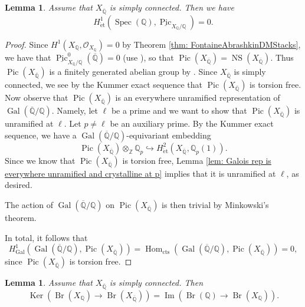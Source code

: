 \documentclass{amsart}
\newtheorem{lem}[prop]{Lemma}
\theoremstyle{definition}
\theoremstyle{remark}
\DeclareMathOperator{\Hom}{Hom}
\DeclareMathOperator{\Ker}{Ker}
\DeclareMathOperator{\Gal}{Gal}
\DeclareMathOperator{\Image}{Im}
\DeclareMathOperator{\Spec}{Spec}
\DeclareMathOperator{\Br}{Br}
\DeclareMathOperator{\Pic}{Pic}
\DeclareMathOperator{\NS}{NS}
\newcommand{\Q}{\mathbb{Q}}
\newcommand{\Qp}{\mathbb {Q}_p}
\newcommand{\Qbar}{\overline{\mathbb{Q}}}
\newcommand{\ZZ}{\mathbb Z}
\newcommand{\et}{\operatorname{\acute{e}t}}%
\begin{document}
\begin{lem}\label{lem Vanishing Galois coho Pic}
Assume that $X_{\Qbar}$ is simply connected.
Then we have
$$
H^{1}_{\et}(\Spec(\Q),\underline{\Pic}_{X_{\Q}/\Q})=0.
$$
\end{lem}
\begin{proof}
Since $H^{1}(X_{\Q},\mathcal{O}_{X_{\Q}})=0$ by Theorem \ref{thm: FontaineAbrashkinDMStacks}, we have that $\underline{\Pic}^{0}_{X_{\Q}/\Q}(\Qbar)=0$ (use \cite[Théorème 4.1.3]{BrochardPicardFunctorStack}), so that 
$
\Pic(X_{\Qbar})=\NS(X_{\Qbar}).
$
Thus $\Pic(X_{\Qbar})$ is a finitely generated abelian group by \cite[Theorem 3.4.1]{BrochardPicardStackFiniteness}.
Since $X_{\Qbar}$ is simply connected, we see by the Kummer exact sequence that $\Pic(X_{\Qbar})$ is torsion free.
Now observe that $\Pic(X_{\Qbar})$ is an everywhere unramified representation of $\Gal(\Qbar/\Q).$
Namely, let $\ell$ be a prime and we want to show that $\Pic(X_{\overline{\Q}})$ is unramified at $\ell.$
Let $p\neq \ell$ be an auxiliary prime.
By the Kummer exact sequence, we have a $\Gal(\overline{\Q}/\Q)$-equivariant embedding
$$
\Pic(X_{\overline{\Q}})\otimes_{\ZZ}\Qp \hookrightarrow H^{2}_{\et}(X_{\overline{\Q}},\Qp(1)).
$$
Since we know that $\Pic(X_{\overline{\Q}})$ is torsion free,
Lemma \ref{lem: Galois rep is everywhere unramified and crystalline at p} implies that it is unramified at $\ell$, as desired.

The action of $\Gal(\overline{\Q}/\Q)$ on $\Pic(X_{\overline{\Q}})$ is then trivial by Minkowski's theorem.

In total, it follows that
$$
    H^{1}_{\Gal}(\Gal(\Qbar/\Q),\Pic(X_{\Qbar}))=\Hom_{\text{cts}}(\Gal(\Qbar/\Q),\Pic(X_{\Qbar}))=0,
$$
since $\Pic(X_{\Qbar})$ is torsion free.
\end{proof}
\begin{lem}\label{Lemma description Kernel}
Assume that $X_{\Qbar}$ is simply connected.
Then
\[
\Ker(\Br(X_{\Q})\rightarrow \Br(X_{\Qbar}))=\Image(\Br(\Q)\rightarrow \Br(X_{\Q})).
\]
\end{lem}
\end{document}
